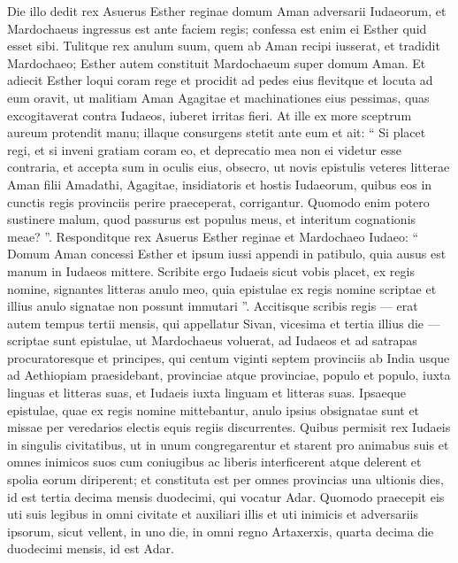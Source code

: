 \begin{biblechapter}
\begin{biblechapter}
\begin{biblechapter}
\begin{biblechapter}
\begin{biblechapter}
\begin{biblechapter}
\begin{biblechapter}
\begin{biblechapter}
\verse Die illo dedit rex Asuerus Esther reginae domum Aman adversarii Iudaeorum, et Mardochaeus ingressus est ante faciem regis; confessa est enim ei Esther quid esset sibi. 
\verse Tulitque rex anulum suum, quem ab Aman recipi iusserat, et tradidit Mardochaeo; Esther autem constituit Mardochaeum super domum Aman.
 \verse Et adiecit Esther loqui coram rege et procidit ad pedes eius flevitque et locuta ad eum oravit, ut malitiam Aman Agagitae et machinationes eius pessimas, quas excogitaverat contra Iudaeos, iuberet irritas fieri. 
\verse At ille ex more sceptrum aureum protendit manu; illaque consurgens stetit ante eum 
\verse et ait: “ Si placet regi, et si inveni gratiam coram eo, et deprecatio mea non ei videtur esse contraria, et accepta sum in oculis eius, obsecro, ut novis epistulis veteres litterae Aman filii Amadathi, Agagitae, insidiatoris et hostis Iudaeorum, quibus eos in cunctis regis provinciis perire praeceperat, corrigantur. 
\verse Quomodo enim potero sustinere malum, quod passurus est populus meus, et interitum cognationis meae? ”.
 \verse Responditque rex Asuerus Esther reginae et Mardochaeo Iudaeo: “ Domum Aman concessi Esther et ipsum iussi appendi in patibulo, quia ausus est manum in Iudaeos mittere. 
\verse Scribite ergo Iudaeis sicut vobis placet, ex regis nomine, signantes litteras anulo meo, quia epistulae ex regis nomine scriptae et illius anulo signatae non possunt immutari ”.
 \verse Accitisque scribis regis — erat autem tempus tertii mensis, qui appellatur Sivan, vicesima et tertia illius die — scriptae sunt epistulae, ut Mardochaeus voluerat, ad Iudaeos et ad satrapas procuratoresque et principes, qui centum viginti septem provinciis ab India usque ad Aethiopiam praesidebant, provinciae atque provinciae, populo et populo, iuxta linguas et litteras suas, et Iudaeis iuxta linguam et litteras suas. 
\verse Ipsaeque epistulae, quae ex regis nomine mittebantur, anulo ipsius obsignatae sunt et missae per veredarios electis equis regiis discurrentes. 
\verse Quibus permisit rex Iudaeis in singulis civitatibus, ut in unum congregarentur et starent pro animabus suis et omnes inimicos suos cum coniugibus ac liberis interficerent atque delerent et spolia eorum diriperent; 
\verse et constituta est per omnes provincias una ultionis dies, id est tertia decima mensis duodecimi, qui vocatur Adar.
 \versea Quomodo praecepit eis uti suis legibus in omni civitate et auxiliari illis et uti inimicis et adversariis ipsorum, sicut vellent, in uno die, 
\verseb in omni regno Artaxerxis, quarta decima die duodecimi mensis, id est Adar.

\end{biblechapter}
\end{biblechapter}
\end{biblechapter}
\end{biblechapter}
\end{biblechapter}
\end{biblechapter}
\end{biblechapter}
\end{biblechapter}
